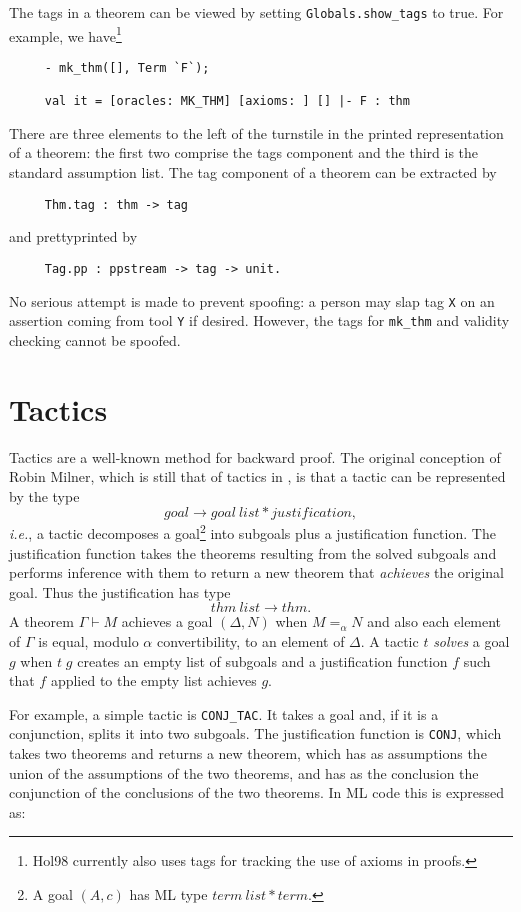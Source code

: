 \documentclass[12pt,fleqn,a4paper]{report}
\begin{document}
The tags in a theorem can be viewed by setting \verb+Globals.show_tags+ to
true. For example, we have\footnote{Hol98 currently also uses tags for
tracking the use of axioms in proofs.}
\begin{verbatim}
     - mk_thm([], Term `F`);

     val it = [oracles: MK_THM] [axioms: ] [] |- F : thm
\end{verbatim}
There are three elements to the left of the turnstile in the printed
representation of a theorem: the first two comprise the tags component and the
third is the standard assumption list. The tag component of a theorem
can be extracted by
 \begin{verbatim}
     Thm.tag : thm -> tag
 \end{verbatim}
\noindent and prettyprinted by
 \begin{verbatim}
     Tag.pp : ppstream -> tag -> unit.
 \end{verbatim}


 No serious attempt is made to prevent spoofing: a person may slap tag
\verb+X+ on an assertion coming from tool \verb+Y+ if desired. However, the
tags for \verb+mk_thm+ and validity checking cannot be spoofed.

\section{Tactics}

Tactics are a well-known method for backward proof. The original
conception of Robin Milner, which is still that of tactics in
\HOL, is that a tactic can be represented by the type
\[ goal \longrightarrow goal\ list * justification, \]
{\it i.e.}, a tactic decomposes a goal\footnote{A goal $(A,c)$ has ML
type $term\ list * term$.} into subgoals plus a
justification function. The justification function takes the theorems
resulting from the solved subgoals and performs inference with them to
return a new theorem that {\it achieves} the original goal. Thus the
justification has type
 \[  thm\ list \longrightarrow thm.  \]
 A theorem $\Gamma \vdash M$ achieves a goal $(\Delta,N)$ when $M =_\alpha
 N$ and also each element of $\Gamma$ is equal, modulo $\alpha$
 convertibility, to an element of $\Delta$. A tactic $t$ {\it solves\/} a
 goal $g$ when $t\; g$ creates an empty list of subgoals and a
 justification function $f$ such that $f$ applied to the empty list
 achieves $g$.

For example, a simple tactic is \verb+CONJ_TAC+. It takes a goal and, if
it is a conjunction, splits it into two subgoals. The justification
function is \verb+CONJ+, which takes two theorems and returns a new
theorem, which has as assumptions the union of the assumptions of the
two theorems, and has as the conclusion the conjunction of the
conclusions of the two theorems. In ML code this is expressed as:
\end{document}
